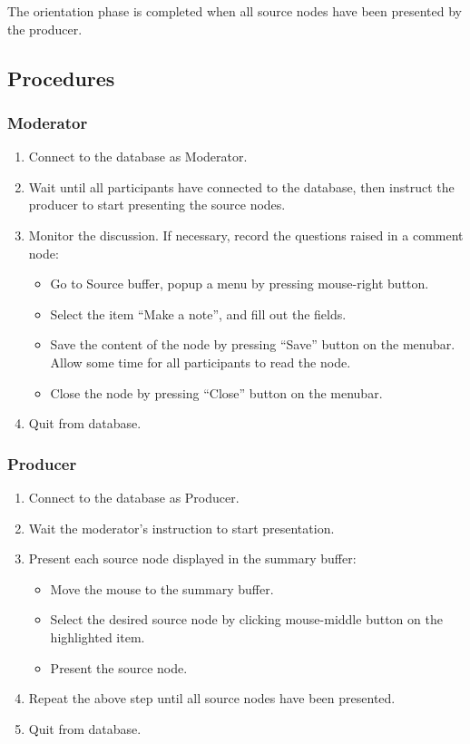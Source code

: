 The orientation phase is completed when all source nodes have been
presented by the producer. 

\subsection {Procedures}

\subsubsection*{Moderator}
\begin{enumerate}
\item Connect to the database as Moderator.
\item Wait until all participants have connected to the database, then
instruct the producer to start presenting the source nodes.
\item Monitor the discussion. If necessary, record the questions
raised in a comment node: 
   \begin{itemize}
   \item Go to Source buffer, popup a menu by pressing mouse-right
   button. 
   \item Select the item ``Make a note'', and fill out the fields.
   \item Save the content of the node by pressing ``Save'' button on
   the menubar. Allow some time for all participants to read the node.
   \item Close the node by pressing ``Close'' button on the menubar.
    \end{itemize}
\item Quit from database.
\end{enumerate}

\subsubsection*{Producer}
\begin{enumerate}
\item Connect to the database as Producer.
\item Wait the moderator's instruction to start presentation.
\item Present each source node displayed in the summary buffer:
 \begin{itemize}
  \item Move the mouse to the summary buffer.
  \item Select the desired source node by clicking mouse-middle button
   on the highlighted item.
  \item Present the source node.
 \end{itemize}
\item Repeat the above step until all source nodes have been presented.
\item Quit from database.
\end{enumerate}

